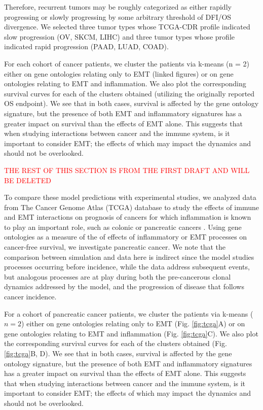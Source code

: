 \documentclass[11pt]{article}
\newcommand{\tcr} { \textcolor{red} }
\begin{document}
Therefore, recurrent tumors may be roughly categorized as either rapidly progressing or slowly progressing by some arbitrary threshold of DFI/OS divergence.
We selected three tumor types whose TCGA-CDR profile indicated slow progression (OV, SKCM, LIHC) and three tumor types whose profile indicated rapid progression (PAAD, LUAD, COAD).
\par
For each cohort of cancer patients, we cluster the patients via k-means (n = 2) either on gene ontologies relating only to EMT (linked figures) or on gene ontologies relating to EMT and inflammation.  We also plot the corresponding survival curves for each of the clusters obtained (utilizing the originally reported OS endpoint). We see that in both cases, survival is affected by the gene ontology signature, but the presence of both EMT and inflammatory signatures has a greater impact on survival than the effects of EMT alone. This suggests that when studying interactions between cancer and the immune system, is it important to consider EMT; the effects of which may impact the dynamics and should not be overlooked. 

\par

\tcr{THE REST OF THIS SECTION IS FROM THE FIRST DRAFT AND WILL BE DELETED}

\par 
To compare these model predictions with experimental studies, we analyzed data from The Cancer Genome Atlas (TCGA) database to study the effects of immune and EMT interactions on prognosis of cancers for which inflammation is known to play an important role, such as colonic or pancreatic cancers \cite{hu10_inflammationinduced, balkwill01_inflammation}. Using gene ontologies as a measure of the of effects of inflammatory or EMT processes on cancer-free survival, we investigate pancreatic cancer. We note that the comparison between simulation and data here is indirect since the model studies processes occurring before incidence, while the data address subsequent events, but analogous processes are at play during both the pre-cancerous clonal dynamics addressed by the model, and the progression of disease that follows cancer incidence. 
\par
For a cohort of pancreatic cancer patients, we cluster the patients via k-means ($n=2$) either on gene ontologies relating only to EMT (Fig. \ref{fig:tcga}A) or on gene ontologies relating to EMT and inflammation (Fig. \ref{fig:tcga}C).
We also plot the corresponding survival curves for each of the clusters obtained (Fig. \ref{fig:tcga}B, D).
We see that in both cases, survival is affected by the gene ontology signature, but the presence of both EMT and inflammatory signatures has a greater impact on survival than the effects of EMT alone.
This suggests that when studying interactions between cancer and the immune system, is it important to consider EMT; the effects of which may impact the dynamics and should not be overlooked.
\end{document}
